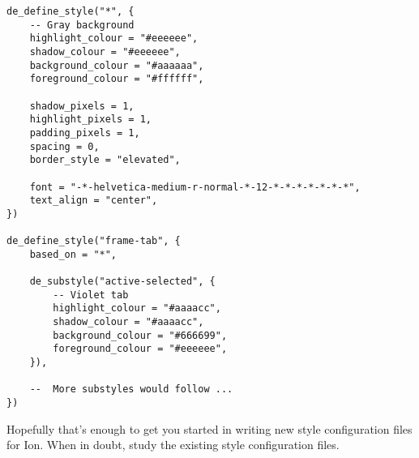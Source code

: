 \begin{verbatim}
de_define_style("*", {
    -- Gray background
    highlight_colour = "#eeeeee",
    shadow_colour = "#eeeeee",
    background_colour = "#aaaaaa",
    foreground_colour = "#ffffff",
    
    shadow_pixels = 1,
    highlight_pixels = 1,
    padding_pixels = 1,
    spacing = 0,
    border_style = "elevated",
    
    font = "-*-helvetica-medium-r-normal-*-12-*-*-*-*-*-*-*",
    text_align = "center",
})

de_define_style("frame-tab", {
    based_on = "*",
    
    de_substyle("active-selected", {
        -- Violet tab
        highlight_colour = "#aaaacc",
        shadow_colour = "#aaaacc",
        background_colour = "#666699",
        foreground_colour = "#eeeeee",
    }),

    --  More substyles would follow ...
})
\end{verbatim}


Hopefully that's enough to get you started in writing new style
configuration files for Ion. When in doubt, study the existing
style configuration files.

